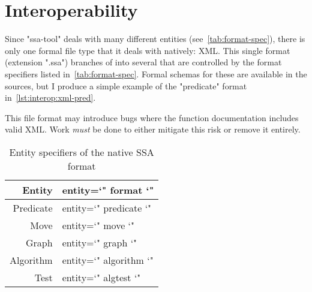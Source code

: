 \section{Interoperability}
\label{sec:iface-interoperability}
Since "ssa-tool" deals with many different entities (see~\autoref{tab:format-spec}),
  there is only one formal file type that it deals with natively: XML.
This single format (extension ".ssa") branches of into several 
  that are controlled by the format specifiers listed in~\autoref{tab:format-spec}.
Formal schemas for these are available in the sources,
  but I produce a simple example of the "predicate" format in~\autoref{lst:interop:xml-pred}.


\begin{warning}
  This file format may introduce bugs where the function documentation includes valid XML.
  Work \emph{must} be done to either mitigate this risk or remove it entirely.
\end{warning}

\begin{table}
  \centering
  \begin{tabular}{r>{\ttfamily\small entity=\char`"}l<{\char`"}}
    \toprule
    Entity    & format    \\
    \midrule
    Predicate & predicate \\
    Move      & move      \\
    Graph     & graph     \\
    Algorithm & algorithm \\
    Test      & algtest   \\
    \bottomrule
  \end{tabular}
  \caption{Entity specifiers of the native SSA format}
  \label{tab:format-spec}
\end{table}

